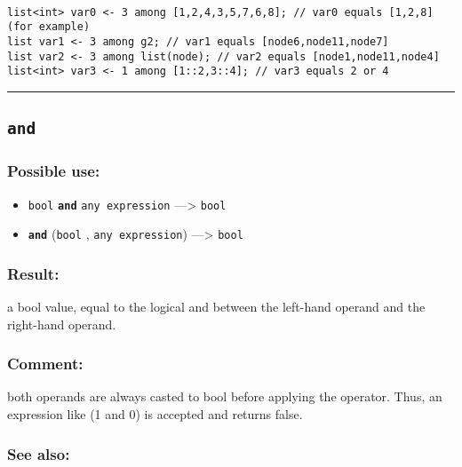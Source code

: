 \documentclass[]{book}
\providecommand{\tightlist}{%
  \setlength{\itemsep}{0pt}\setlength{\parskip}{0pt}}
\theoremstyle{definition}
\theoremstyle{definition}
\theoremstyle{definition}
\theoremstyle{remark}
\begin{document}
\begin{verbatim}
 
list<int> var0 <- 3 among [1,2,4,3,5,7,6,8]; // var0 equals [1,2,8] (for example) 
list var1 <- 3 among g2; // var1 equals [node6,node11,node7] 
list var2 <- 3 among list(node); // var2 equals [node1,node11,node4] 
list<int> var3 <- 1 among [1::2,3::4]; // var3 equals 2 or 4
\end{verbatim}

\begin{center}\rule{0.5\linewidth}{\linethickness}\end{center}

\subsection{\texorpdfstring{\texttt{and}}{and}}\label{and}

\subsubsection{Possible use:}\label{possible-use-35}

\begin{itemize}
\tightlist
\item
  \texttt{bool} \textbf{\texttt{and}} \texttt{any\ expression}
  ---\textgreater{} \texttt{bool}
\item
  \textbf{\texttt{and}} (\texttt{bool} , \texttt{any\ expression})
  ---\textgreater{} \texttt{bool}
\end{itemize}

\subsubsection{Result:}\label{result-34}

a bool value, equal to the logical and between the left-hand operand and
the right-hand operand.

\subsubsection{Comment:}\label{comment-6}

both operands are always casted to bool before applying the operator.
Thus, an expression like (1 and 0) is accepted and returns false.

\subsubsection{See also:}\label{see-also-25}
\end{document}
